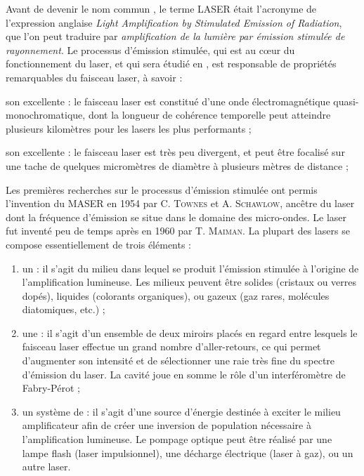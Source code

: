 \documentclass[12pt,fancy]{cours}
\begin{document}
Avant de devenir le nom commun , le terme LASER était l'acronyme de l'expression anglaise \emph{Light Amplification by Stimulated  Emission of Radiation}, que l'on peut traduire par \emph{amplification de la lumière par émission stimulée de rayonnement}. Le processus d'émission stimulée, qui est au cœur du fonctionnement du laser, et qui sera étudié en , est responsable de propriétés remarquables du faisceau laser, à savoir :
\begin{liste}
  \item son excellente  : le faisceau laser est constitué d'une onde électromagnétique quasi-monochromatique, dont la longueur de cohérence temporelle peut atteindre plusieurs kilomètres pour les lasers les plus performants ;
  \item son excellente  : le faisceau laser est très peu divergent, et peut être focalisé sur une tache de quelques micromètres de diamètre à plusieurs mètres de distance ;
\end{liste}
Les premières recherches sur le processus d'émission stimulée ont permis l'invention du MASER en 1954 par C. \textsc{Townes} et A. \textsc{Schawlow},
ancêtre du laser dont la fréquence d'émission se situe dans le domaine des micro-ondes. Le laser fut inventé peu de temps après en 1960 par T. \textsc{Maiman}. La plupart des lasers se compose essentiellement de trois éléments :
\begin{enumerate}
  \item un  : il s'agit du milieu dans lequel se produit l'émission stimulée  à l'origine de l'amplification lumineuse. Les milieux peuvent être solides (cristaux ou verres dopés), liquides (colorants organiques), ou gazeux (gaz rares, molécules diatomiques, etc.) ;
  \item une  : il s'agit d'un ensemble de deux miroirs placés en regard entre lesquels le faisceau laser effectue un grand nombre d'aller-retours, ce qui permet d'augmenter son intensité et de sélectionner une raie très fine du spectre d'émission du laser. La cavité joue en somme le rôle d'un interféromètre de Fabry-Pérot ;
  \item un système de  : il s'agit d'une source d'énergie destinée à exciter le milieu amplificateur afin de créer une inversion de population nécessaire à l'amplification lumineuse. Le pompage optique peut être réalisé par une lampe flash (laser impulsionnel), une décharge électrique (laser à gaz), ou un autre laser.
\end{enumerate}
\end{document}
